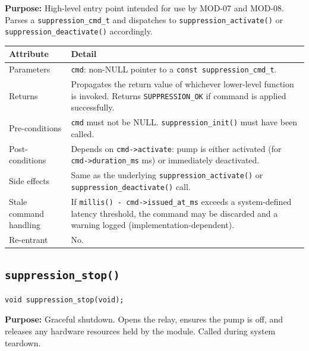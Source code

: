 \documentclass[12pt]{article}
\begin{document}
\textbf{Purpose:} High-level entry point intended for use by MOD-07 and MOD-08. Parses a \texttt{suppression\_cmd\_t} and dispatches to \texttt{suppression\_activate()} or \texttt{suppression\_deactivate()} accordingly.

\begin{table}[H]
\centering\small
\begin{tabularx}{\textwidth}{L{3.5cm} X}
\toprule
\textbf{Attribute} & \textbf{Detail} \\
\midrule
Parameters & \texttt{cmd}: non-NULL pointer to a \texttt{const suppression\_cmd\_t}. \\
Returns & Propagates the return value of whichever lower-level function is invoked. Returns \texttt{SUPPRESSION\_OK} if command is applied successfully. \\
Pre-conditions & \texttt{cmd} must not be NULL. \texttt{suppression\_init()} must have been called. \\
Post-conditions & Depends on \texttt{cmd->activate}: pump is either activated (for \texttt{cmd->duration\_ms} ms) or immediately deactivated. \\
Side effects & Same as the underlying \texttt{suppression\_activate()} or \texttt{suppression\_deactivate()} call. \\
Stale command handling & If \texttt{millis() - cmd->issued\_at\_ms} exceeds a system-defined latency threshold, the command may be discarded and a warning logged (implementation-dependent). \\
Re-entrant & No. \\
\bottomrule
\end{tabularx}
\end{table}

\subsection{\texttt{suppression\_stop()}}

\begin{lstlisting}[style=cstyle, numbers=none]
void suppression_stop(void);
\end{lstlisting}

\textbf{Purpose:} Graceful shutdown. Opens the relay, ensures the pump is off, and releases any hardware resources held by the module. Called during system teardown.
\end{document}
